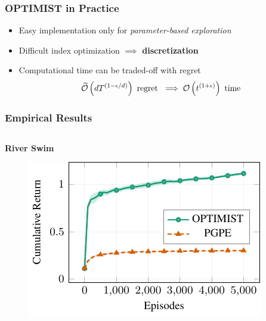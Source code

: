 \documentclass[aspectratio=169, table]{beamer}
\newcommand{\eno}[1]{\textcolor{orangep}{\textbf{#1}}}
\begin{document}
\begin{frame} 
\frametitle{OPTIMIST in Practice}
\begin{itemize}
	\setlength{\itemsep}{20pt}
	\item<1-> Easy implementation only for \emph{parameter-based exploration}~\cite{sehnke2008policy}
	\item<2-> Difficult index optimization $\implies$ \eno{discretization}
	\item<3-> Computational time can be traded-off with regret
	\vspace{20pt}
	\[
		\widetilde{\mathcal{O}}\left(dT^{(1-\epsilon/d)}\right) \text{ regret } \implies \mathcal{O}\left(t^{(1+\epsilon)}\right) \text{ time }
	\]
\end{itemize}
\end{frame}

\begin{frame}
\frametitle{Empirical Results} 
\vspace{.5cm}
\begin{columns}
	\begin{column}{.5\textwidth}
		\begin{overlayarea}{\textwidth}{\textheight}
		\centering
		{\bf River Swim}
		\begin{figure}
			\includegraphics[width=\textwidth]{river.pdf}
		\end{figure}
	\end{overlayarea}	
	\end{column}
\hfill
	\begin{column}{.5\textwidth}
		\begin{overlayarea}{\textwidth}{\textheight}
		\centering
\end{overlayarea}
\end{column}
\end{columns}
\end{frame}
\end{document}
